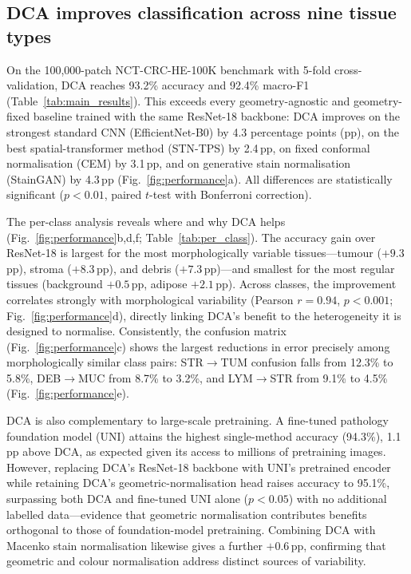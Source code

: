 \documentclass[pdflatex,sn-nature]{sn-jnl}%
\theoremstyle{thmstyleone}%
\theoremstyle{thmstyletwo}%
\theoremstyle{thmstylethree}%
\begin{document}
\subsection{DCA improves classification across nine tissue types}

On the 100{,}000-patch NCT-CRC-HE-100K benchmark with 5-fold cross-validation,
DCA reaches 93.2\% accuracy and 92.4\% macro-F1 (Table~\ref{tab:main_results}).
This exceeds every geometry-agnostic and geometry-fixed baseline trained with the
same ResNet-18 backbone: DCA improves on the strongest standard CNN
(EfficientNet-B0) by 4.3 percentage points (pp), on the best spatial-transformer
method (STN-TPS) by 2.4\,pp, on fixed conformal normalisation (CEM) by 3.1\,pp,
and on generative stain normalisation (StainGAN) by 4.3\,pp
(Fig.~\ref{fig:performance}a). All differences are statistically significant
($p<0.01$, paired $t$-test with Bonferroni correction).

The per-class analysis reveals where and why DCA helps
(Fig.~\ref{fig:performance}b,d,f; Table~\ref{tab:per_class}). The accuracy gain
over ResNet-18 is largest for the most morphologically variable tissues---tumour
($+9.3$\,pp), stroma ($+8.3$\,pp), and debris ($+7.3$\,pp)---and smallest for the
most regular tissues (background $+0.5$\,pp, adipose $+2.1$\,pp). Across classes,
the improvement correlates strongly with morphological variability (Pearson
$r=0.94$, $p<0.001$; Fig.~\ref{fig:performance}d), directly linking DCA's benefit
to the heterogeneity it is designed to normalise. Consistently, the confusion
matrix (Fig.~\ref{fig:performance}c) shows the largest reductions in
error precisely among morphologically similar class pairs: STR$\rightarrow$TUM
confusion falls from 12.3\% to 5.8\%, DEB$\rightarrow$MUC from 8.7\% to 3.2\%, and
LYM$\rightarrow$STR from 9.1\% to 4.5\% (Fig.~\ref{fig:performance}e).

DCA is also complementary to large-scale pretraining. A fine-tuned pathology
foundation model (UNI) attains the highest single-method accuracy (94.3\%),
1.1\,pp above DCA, as expected given its access to millions of pretraining
images. However, replacing DCA's ResNet-18 backbone with UNI's pretrained encoder
while retaining DCA's geometric-normalisation head raises accuracy to 95.1\%,
surpassing both DCA and fine-tuned UNI alone ($p<0.05$) with no additional
labelled data---evidence that geometric normalisation contributes benefits
orthogonal to those of foundation-model pretraining. Combining DCA with Macenko
stain normalisation likewise gives a further $+0.6$\,pp, confirming that
geometric and colour normalisation address distinct sources of variability.
\end{document}
